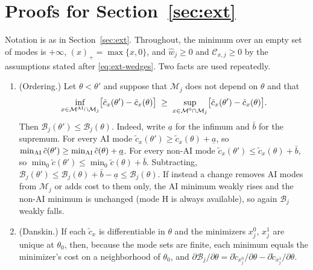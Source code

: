 \section{Proofs for Section~\ref{sec:ext}}\label{app:proofs-ext}

Notation is as in Section~\ref{sec:ext}. Throughout, the minimum over an empty set of modes is $+\infty$, $(x)_+=\max\{x,0\}$, and $\hat w_j\ge0$ and $\mathcal C_{x,j}\ge0$ by the assumptions stated after \eqref{eq:ext-wedges}. Two facts are used repeatedly.

\begin{enumerate}
\item[(E1)] (Ordering.) Let $\theta<\theta'$ and suppose that $\mathcal M_j$ does not depend on $\theta$ and that
\[
\inf_{x\in\mathcal M^{\rm AI}\cap\mathcal M_j}\bigl[\tilde c_x(\theta')-\tilde c_x(\theta)\bigr]\;\ge\;\sup_{x\in\mathcal M^{0}\cap\mathcal M_j}\bigl[\tilde c_x(\theta')-\tilde c_x(\theta)\bigr].
\]
Then $\mathcal B_j(\theta')\le\mathcal B_j(\theta)$. Indeed, write $\underline a$ for the infimum and $\bar b$ for the supremum. For every AI mode $\tilde c_x(\theta')\ge\tilde c_x(\theta)+\underline a$, so $\min_{\rm AI}\tilde c(\theta')\ge\min_{\rm AI}\tilde c(\theta)+\underline a$. For every non-AI mode $\tilde c_x(\theta')\le\tilde c_x(\theta)+\bar b$, so $\min_0\tilde c(\theta')\le\min_0\tilde c(\theta)+\bar b$. Subtracting, $\mathcal B_j(\theta')\le\mathcal B_j(\theta)+\bar b-\underline a\le\mathcal B_j(\theta)$. If instead a change removes AI modes from $\mathcal M_j$ or adds cost to them only, the AI minimum weakly rises and the non-AI minimum is unchanged (mode H is always available), so again $\mathcal B_j$ weakly falls.
\item[(E2)] (Danskin.) If each $\tilde c_x$ is differentiable in $\theta$ and the minimizers $x^0_j$, $x^1_j$ are unique at $\theta_0$, then, because the mode sets are finite, each minimum equals the minimizer's cost on a neighborhood of $\theta_0$, and $\partial\mathcal B_j/\partial\theta=\partial\tilde c_{x^0_j}/\partial\theta-\partial\tilde c_{x^1_j}/\partial\theta$.
\end{enumerate}

